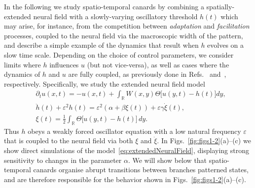 \documentclass[aps,prl,reprint,superscriptaddress]{revtex4-1}
\newcommand{\RSet}{\mathbb{R}}
\newcommand{\epsi}{\varepsilon}
\begin{document}
In the following we study spatio-temporal canards by combining a spatially-extended
neural field with a slowly-varying oscillatory threshold $h(t)$ which may arise, for
instance, from the competition between \emph{adaptation} and \emph{facilitation}
processes, coupled to the neural field via the macroscopic width of the pattern,
and describe a simple example of the dynamics that result when $h$ evolves on a
slow time scale. Depending on the choice of control parameters, we consider limits
where $h$ influences $u$ (but not vice-versa), as well as cases where the dynamics of
$h$ and $u$ are fully coupled, as previously done in
Refs.~\cite{Brackley2007aa,Thul:2016gr} and~\cite{Coombes:2005hp,coombes2007exotic},
respectively.
%
Specifically, we study the extended neural field model
\begin{equation}\label{eq:extendedNeuralField}
\begin{aligned}
  & \partial_t u(x,t) = - u(x,t) +\!\! \int_{\RSet} W(x,y)\Theta
  \big[u(y,t)\!-\!h(t)\! \big]dy,
  \\
  & \ddot h(t) + \epsi^2 h(t) = \epsi^2 ( \alpha + \beta \xi(t)) + \epsi \gamma \dot \xi(t), \\
  & \xi(t) = \frac{1}{2} \int_\RSet \Theta \big[ u(y,t) - h(t) \big]
  \, dy.
\end{aligned}
\end{equation}
Thus $h$ obeys a weakly forced oscillator equation with a low natural frequency
$\epsi$ that is
coupled to the neural field via both $\xi$ and $\dot \xi$. In
Figs.~\ref{fig:figs1-2}(a)--(c) we show direct simulations of the
model~\eqref{eq:extendedNeuralField}, displaying strong sensitivity to changes in the
parameter $\alpha$. We will show below that spatio-temporal canards organise abrupt
transitions between branches patterned states, and are therefore responsible for the
behavior shown in Figs.~\ref{fig:figs1-2}(a)--(c). 
\end{document}

